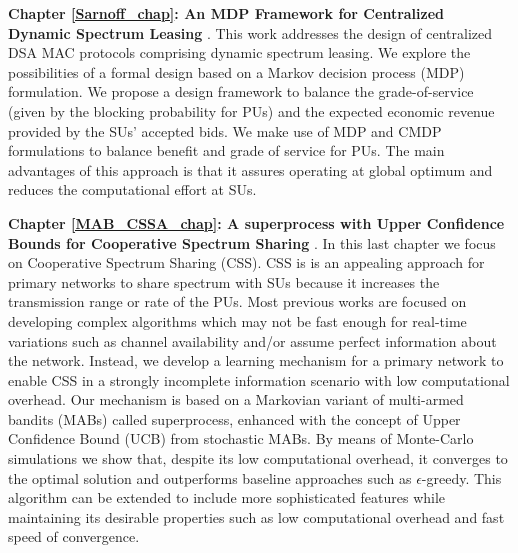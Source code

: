 \textbf{Chapter \ref{Sarnoff_chap}: An MDP Framework for Centralized Dynamic Spectrum Leasing} \cite{ref:Alcaraz2012}.
This work addresses the design of centralized DSA MAC protocols comprising dynamic spectrum leasing. We explore the possibilities of a formal design based on a Markov decision process (MDP) formulation. We propose a design framework to balance the grade-of-service (given by the blocking probability for PUs) and the expected economic revenue provided by the SUs' accepted bids. We make use of MDP and CMDP formulations to balance benefit and grade of service for PUs. 
The main advantages of this approach is that it assures operating at global optimum and reduces the computational effort at SUs.

\textbf{Chapter \ref{MAB_CSSA_chap}: A superprocess with Upper Confidence Bounds for Cooperative Spectrum Sharing} \cite{ref:Mario2015_MAB_CSSA_1,ref:Mario2015_MAB_CSSA_2}. In this last chapter we focus on Cooperative Spectrum Sharing (CSS). CSS is is an appealing approach for primary networks to share spectrum with SUs because it increases the transmission range or rate of the PUs. Most previous works are focused on developing complex algorithms which may not be fast enough for real-time variations such as channel availability and/or assume perfect information about the network. Instead, we develop a learning mechanism for a primary network to enable CSS in a strongly incomplete information scenario with low computational overhead. Our mechanism is based on a Markovian variant of multi-armed bandits (MABs) called superprocess, enhanced with the concept of Upper Confidence Bound (UCB) from stochastic MABs. By means of Monte-Carlo simulations we show that, despite its low computational overhead, it converges to the optimal solution and outperforms baseline approaches such as $\epsilon$-greedy. This algorithm can be extended to include more sophisticated features while maintaining its desirable properties such as low computational overhead and fast speed of convergence. 


